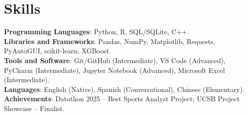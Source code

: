 \documentclass[letterpaper,11pt]{article}
\begin{document}
\section{Skills}
 \begin{itemize}[leftmargin=0.15in, label={}]
    \small{\item{
     \textbf{Programming Languages}{: Python, R, SQL/SQLite, C++.} \\
     \textbf{Libraries and Frameworks}{: Pandas, NumPy, Matplotlib, Requests, PyAutoGUI, scikit-learn, XGBoost.} \\
     \textbf{Tools and Software}{: Git/GitHub (Intermediate), VS Code (Advanced), PyCharm (Intermediate), Jupyter Notebook (Advanced), Microsoft Excel (Intermediate).} \\
     \textbf{Languages}{: English (Native), Spanish (Conversational), Chinese (Elementary).} \\
     \textbf{Achievements}{: Datathon 2025 -- Best Sports Analyst Project; UCSB Project Showcase -- Finalist.}
    }}
 \end{itemize}
\end{document}
